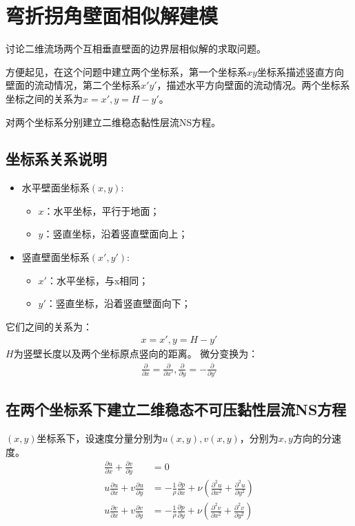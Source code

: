 \section{弯折拐角壁面相似解建模}
讨论二维流场两个互相垂直壁面的边界层相似解的求取问题。

方便起见，在这个问题中建立两个坐标系，第一个坐标系$xy$坐标系描述竖直方向壁面的流动情况，第二个坐标系$x'y'$，描述水平方向壁面的流动情况。两个坐标系坐标之间的关系为$x=x',y=H-y'$。

对两个坐标系分别建立二维稳态黏性层流NS方程。

\subsection{坐标系关系说明}
\begin{itemize}
    \item 水平壁面坐标系$(x,y)$:
    \begin{itemize}
        \item $x$：水平坐标，平行于地面；
        \item $y$：竖直坐标，沿着竖直壁面向上；
    \end{itemize}
    \item 竖直壁面坐标系$(x',y')$:
    \begin{itemize}
        \item $x'$：水平坐标，与x相同；
        \item $y'$：竖直坐标，沿着竖直壁面向下；
    \end{itemize}
\end{itemize}
它们之间的关系为：
\begin{align*}
    x=x',y=H-y'
\end{align*}
$H$为竖壁长度以及两个坐标原点竖向的距离。
微分变换为：
\begin{align*}
    \frac{\partial}{\partial x}=\frac{\partial }{\partial x'},\frac{\partial}{\partial y}=-\frac{\partial}{\partial y'}
\end{align*}

\subsection{在两个坐标系下建立二维稳态不可压黏性层流NS方程}
$(x,y)$坐标系下，设速度分量分别为$u(x,y),v(x,y)$，分别为$x,y$方向的分速度。
\begin{align}
    \frac{\partial u}{\partial x}+\frac{\partial v}{\partial y}&=0\\
    u\frac{\partial u}{\partial x}+v\frac{\partial u}{\partial y}&=-\frac{1}{\rho}\frac{\partial p}{\partial x}+\nu\left(\frac{\partial^{2} u}{\partial x^{2}}+\frac{\partial^{2} u}{\partial y^{2}}\right)\\
    u\frac{\partial v}{\partial x}+v\frac{\partial v}{\partial y}&=-\frac{1}{\rho}\frac{\partial p}{\partial y}+\nu\left(\frac{\partial^{2} v}{\partial x^{2}}+\frac{\partial^{2} v}{\partial y^{2}}\right)
\end{align}

